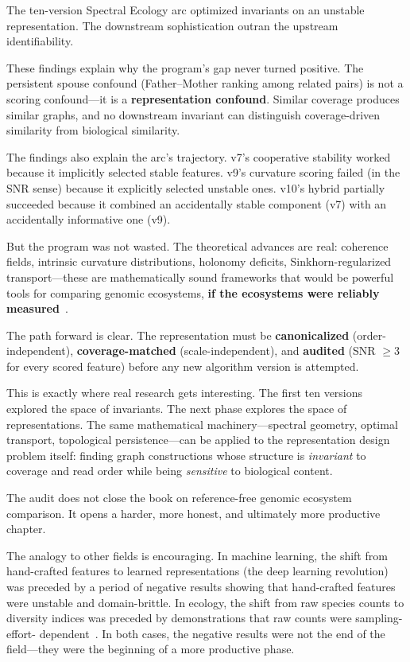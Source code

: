 \documentclass{../yalumba}
\begin{document}
\begin{pullquote}
The ten-version Spectral Ecology arc optimized invariants on an unstable
representation.  The downstream sophistication outran the upstream
identifiability.
\end{pullquote}

These findings explain why the program's gap never turned positive.
The persistent spouse confound (Father--Mother ranking among related
pairs) is not a scoring confound---it is a \textbf{representation
confound}.  Similar coverage produces similar graphs, and no downstream
invariant can distinguish coverage-driven similarity from biological
similarity.

The findings also explain the arc's trajectory.  v7's cooperative
stability worked because it implicitly selected stable features.  v9's
curvature scoring failed (in the SNR sense) because it explicitly
selected unstable ones.  v10's hybrid partially succeeded because it
combined an accidentally stable component (v7) with an accidentally
informative one (v9).

But the program was not wasted.  The theoretical advances are real:
coherence fields, intrinsic curvature distributions, holonomy
deficits, Sinkhorn-regularized transport---these are mathematically
sound frameworks that would be powerful tools for comparing genomic
ecosystems, \textbf{if the ecosystems were reliably
measured}~\cite{chung1997spectral, memoli2011gromov,
edelsbrunner2010computational, peyre2019computational}.

The path forward is clear.  The representation must be
\textbf{canonicalized} (order-independent), \textbf{coverage-matched}
(scale-independent), and \textbf{audited} (SNR $\geq 3$ for every
scored feature) before any new algorithm version is attempted.

This is exactly where real research gets interesting.  The first ten
versions explored the space of invariants.  The next phase explores the
space of representations.  The same mathematical machinery---spectral
geometry, optimal transport, topological persistence---can be applied to
the representation design problem itself: finding graph constructions
whose structure is \emph{invariant} to coverage and read order while
being \emph{sensitive} to biological content.

The audit does not close the book on reference-free genomic ecosystem
comparison.  It opens a harder, more honest, and ultimately more
productive chapter.

The analogy to other fields is encouraging.  In machine learning, the
shift from hand-crafted features to learned representations (the deep
learning revolution) was preceded by a period of negative results showing
that hand-crafted features were unstable and domain-brittle.  In
ecology, the shift from raw species counts to diversity indices was
preceded by demonstrations that raw counts were sampling-effort-
dependent~\cite{bray1957}.  In both cases, the negative results were not
the end of the field---they were the beginning of a more productive
phase.
\end{document}
